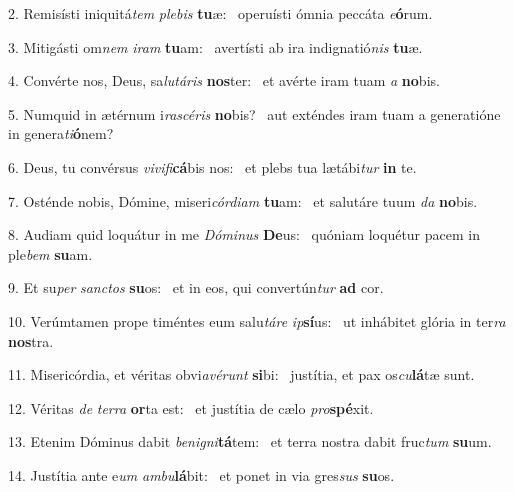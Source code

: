 2. Remisísti iniquitá\textit{tem} \textit{ple}\textit{bis} \textbf{tu}æ: \ast\  operuísti ómnia peccáta \textit{e}\textbf{ó}rum.\

3. Mitigásti om\textit{nem} \textit{i}\textit{ram} \textbf{tu}am: \ast\  avertísti ab ira indignatió\textit{nis} \textbf{tu}æ.\

4. Convérte nos, Deus, sa\textit{lu}\textit{tá}\textit{ris} \textbf{nos}ter: \ast\  et avérte iram tuam \textit{a} \textbf{no}bis.\

5. Numquid in ætérnum i\textit{ra}\textit{scé}\textit{ris} \textbf{no}bis? \ast\  aut exténdes iram tuam a generatióne in genera\textit{ti}\textbf{ó}nem?\

6. Deus, tu convérsus \textit{vi}\textit{vi}\textit{fi}\textbf{cá}bis nos: \ast\  et plebs tua lætábi\textit{tur} \textbf{in} te.\

7. Osténde nobis, Dómine, miseri\textit{cór}\textit{di}\textit{am} \textbf{tu}am: \ast\  et salutáre tuum \textit{da} \textbf{no}bis.\

8. Audiam quid loquátur in me \textit{Dó}\textit{mi}\textit{nus} \textbf{De}us: \ast\  quóniam loquétur pacem in ple\textit{bem} \textbf{su}am.\

9. Et su\textit{per} \textit{sanc}\textit{tos} \textbf{su}os: \ast\  et in eos, qui convertún\textit{tur} \textbf{ad} cor.\

10. Verúmtamen prope timéntes eum salu\textit{tá}\textit{re} \textit{ip}\textbf{sí}us: \ast\  ut inhábitet glória in ter\textit{ra} \textbf{nos}tra.\

11. Misericórdia, et véritas obvi\textit{a}\textit{vé}\textit{runt} \textbf{si}bi: \ast\  justítia, et pax os\textit{cu}\textbf{lá}tæ sunt.\

12. Véritas \textit{de} \textit{ter}\textit{ra} \textbf{or}ta est: \ast\  et justítia de cælo \textit{pro}\textbf{spé}xit.\

13. Etenim Dóminus dabit \textit{be}\textit{ni}\textit{gni}\textbf{tá}tem: \ast\  et terra nostra dabit fruc\textit{tum} \textbf{su}um.\

14. Justítia ante e\textit{um} \textit{am}\textit{bu}\textbf{lá}bit: \ast\  et ponet in via gres\textit{sus} \textbf{su}os.\

